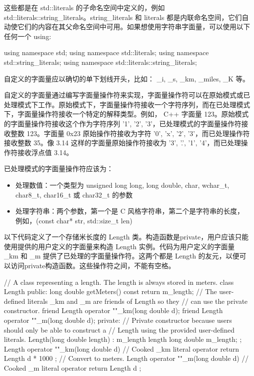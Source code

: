 这些都是在 std::literals 的子命名空间中定义的，例如 std::literals::string\_literals。string\_literals 和 literals 都是内联命名空间，它们自动使它们的内容在其父命名空间中可用。如果想使用字符串字面量，可以使用以下任何一个 using:

\begin{cpp}
using namespace std;
using namespace std::literals;
using namespace std::string_literals;
using namespace std::literals::string_literals;
\end{cpp}



自定义的字面量应以确切的单下划线开头，比如： \_i, \_s, \_km, \_miles, \_K 等。

自定义的字面量通过编写字面量操作符来实现，字面量操作符可以在原始模式或已处理模式下工作。原始模式下，字面量操作符接收一个字符序列，而在已处理模式下，字面量操作符接收一个特定的解释类型。例如， C++ 字面量 123。原始模式的字面量操作符接收这个作为字符序列 '1', '2', '3'，已处理模式的字面量操作符接收整数 123。字面量 0x23 原始操作符接收为字符 '0', 'x', '2', '3'，而已处理操作符接收整数 35。像 3.14 这样的字面量原始操作符接收为 '3', '.', '1', '4'，而已处理操作符接收浮点值 3.14。


已处理模式的字面量操作符应该为：

\begin{itemize}
\item
处理数值：一个类型为 unsigned long long, long double, char, wchar\_t, char8\_t, char16\_t 或 char32\_t 的参数

\item
处理字符串：两个参数，第一个是 C 风格字符串，第二个是字符串的长度，例如，(const char* str, std::size\_t len)
\end{itemize}

以下代码定义了一个存储米长度的 Length 类。构造函数是private，用户应该只能使用提供的用户定义的字面量来构造 Length 实例。代码为用户定义的字面量 \_km 和 \_m 提供了已处理的字面量操作符。这两个都是 Length 的友元，以便可以访问private构造函数。这些操作符之间，不能有空格。

\begin{cpp}
// A class representing a length. The length is always stored in meters.
class Length
{
    public:
        long double getMeters() const { return m_length; }
        // The user-defined literals _km and _m are friends of Length so they
        // can use the private constructor.
        friend Length operator ""_km(long double d);
        friend Length operator ""_m(long double d);
    private:
        // Private constructor because users should only be able to construct a
        // Length using the provided user-defined literals.
        Length(long double length) : m_length { length } {}
        long double m_length;
};
Length operator ""_km(long double d) // Cooked _km literal operator
{
    return Length { d * 1000 }; // Convert to meters.
}
Length operator ""_m(long double d) // Cooked _m literal operator
{
    return Length { d };
}
\end{cpp}


